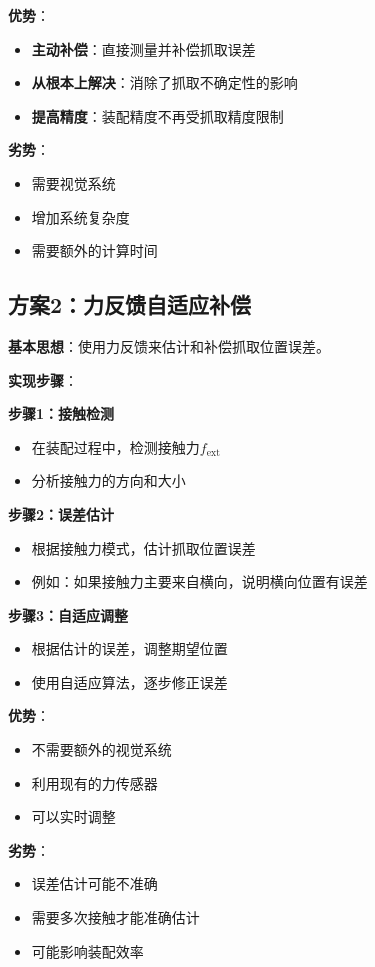 \documentclass[12pt,a4paper]{article}
\begin{document}
\textbf{优势}：
\begin{itemize}
\item \textbf{主动补偿}：直接测量并补偿抓取误差
\item \textbf{从根本上解决}：消除了抓取不确定性的影响
\item \textbf{提高精度}：装配精度不再受抓取精度限制
\end{itemize}

\textbf{劣势}：
\begin{itemize}
\item 需要视觉系统
\item 增加系统复杂度
\item 需要额外的计算时间
\end{itemize}

\subsection{方案2：力反馈自适应补偿}

\textbf{基本思想}：使用力反馈来估计和补偿抓取位置误差。

\textbf{实现步骤}：

\textbf{步骤1：接触检测}
\begin{itemize}
\item 在装配过程中，检测接触力$f_{\text{ext}}$
\item 分析接触力的方向和大小
\end{itemize}

\textbf{步骤2：误差估计}
\begin{itemize}
\item 根据接触力模式，估计抓取位置误差
\item 例如：如果接触力主要来自横向，说明横向位置有误差
\end{itemize}

\textbf{步骤3：自适应调整}
\begin{itemize}
\item 根据估计的误差，调整期望位置
\item 使用自适应算法，逐步修正误差
\end{itemize}

\textbf{优势}：
\begin{itemize}
\item 不需要额外的视觉系统
\item 利用现有的力传感器
\item 可以实时调整
\end{itemize}

\textbf{劣势}：
\begin{itemize}
\item 误差估计可能不准确
\item 需要多次接触才能准确估计
\item 可能影响装配效率
\end{itemize}
\end{document}
